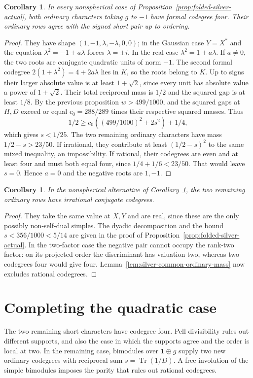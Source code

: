 \documentclass[11pt,reqno]{amsart}
\newtheorem{corollary}[theorem]{Corollary}
\theoremstyle{remark}\newtheorem{remark}[theorem]{Remark}
\numberwithin{equation}{section}
\begin{document}
\begin{corollary}\label{cor:folded-silver-matching}
In every nonspherical case of Proposition~\ref{prop:folded-silver-actual}, both ordinary characters taking $g$ to $-1$ have formal codegree four. Their ordinary rows agree with the signed short pair up to ordering.
\end{corollary}
\begin{proof}
They have shape $(1,-1,\lambda,-\lambda,0,0)$; in the Gaussian case $Y=X^*$ and the equation $\lambda^2=-1+a\lambda$ forces $\lambda=\pm i$. In the real case $\lambda^2=1+a\lambda$. If $a\ne0$, the two roots are conjugate quadratic units of norm $-1$. The second formal codegree $2(1+\lambda^2)=4+2a\lambda$ lies in $K$, so the roots belong to $K$. Up to signs their larger absolute value is at least $1+\sqrt2$, since every unit has absolute value a power of $1+\sqrt2$. Their total reciprocal mass is $1/2$ and the squared gap is at least $1/8$. By the previous proposition $w>499/1000$, and the squared gaps at $H,D$ exceed or equal $c_0=288/289$ times their respective squared masses. Thus
\[
 1/2\ge c_0((499/1000)^2+2s^2)+1/4,
\]
which gives $s<1/25$. The two remaining ordinary characters have mass $1/2-s>23/50$. If irrational, they contribute at least $(1/2-s)^2$ to the same mixed inequality, an impossibility. If rational, their codegrees are even and at least four and must both equal four, since $1/4+1/6<23/50$. That would leave $s=0$. Hence $a=0$ and the negative roots are $1,-1$.
\end{proof}

\begin{corollary}\label{prop:folded-silver-ordinary-irrational}
In the nonspherical alternative of Corollary~\ref{cor:folded-silver-matching},
the two remaining ordinary rows have irrational conjugate codegrees.
\end{corollary}
\begin{proof}
They take the same value at $X,Y$ and are real, since these are the
only possibly non-self-dual simples. The dyadic decomposition and
the bound $s<356/1000<5/14$ are given in the proof of
Proposition~\ref{prop:folded-silver-actual}. In the two-factor case
the negative pair cannot occupy the rank-two factor: on its projected
order the discriminant has valuation two, whereas two codegrees four
would give four. Lemma~\ref{lem:silver-common-ordinary-mass} now
excludes rational codegrees.
\end{proof}

\section{Completing the quadratic case}\label{sec:guide-pell}
The two remaining short characters have codegree four. Pell
divisibility rules out different supports, and also the case in
which the supports agree and the order is local at two. In the
remaining case, bimodules over $\mathbf1\oplus g$ supply two
new ordinary codegrees with reciprocal sum
$s=\operatorname{Tr}(1/D)$. A free involution of the simple
bimodules imposes the parity that rules out rational codegrees.
\end{document}

